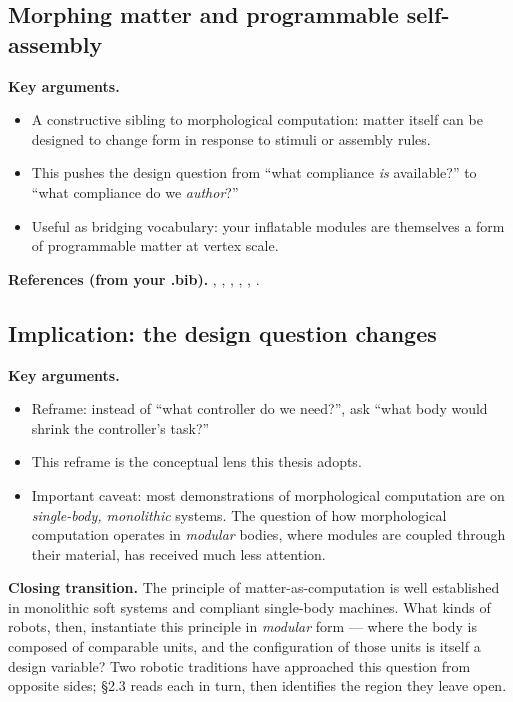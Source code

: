 \subsection{Morphing matter and programmable self-assembly}
\label{subsec:morph-matter}

\textbf{Key arguments.}
\begin{itemize}
    \item A constructive sibling to morphological computation: matter
          itself can be designed to change form in response to stimuli
          or assembly rules.
    \item This pushes the design question from ``what compliance \emph{is}
          available?'' to ``what compliance do we \emph{author}?''
    \item Useful as bridging vocabulary: your inflatable modules are
          themselves a form of programmable matter at vertex scale.
\end{itemize}

\textbf{References (from your .bib).}
\cite{tibbitsThingsFallTogether2021},
\cite{cademartiriProgrammableSelfassembly2015},
\cite{wangRoboMatterReconfigurableMultifunctional2024},
\cite{adminNewProgrammableMaterials2022},
\cite{schaffner3DPrintingRobotic2018},
\cite{pattersonMethod3DPrinting2023}.

\subsection{Implication: the design question changes}
\label{subsec:design-question-changes}

\textbf{Key arguments.}
\begin{itemize}
    \item Reframe: instead of ``what controller do we need?'', ask
          ``what body would shrink the controller's task?''
    \item This reframe is the conceptual lens this thesis adopts.
    \item Important caveat: most demonstrations of morphological
          computation are on \emph{single-body, monolithic} systems.
          The question of how morphological computation operates in
          \emph{modular} bodies, where modules are coupled through
          their material, has received much less attention.
\end{itemize}

\textbf{Closing transition.} The principle of matter-as-computation
is well established in monolithic soft systems and compliant
single-body machines. What kinds of robots, then, instantiate this
principle in \emph{modular} form --- where the body is composed
of comparable units, and the configuration of those units is itself
a design variable? Two robotic traditions have approached this
question from opposite sides; \S2.3 reads each in turn, then
identifies the region they leave open.

